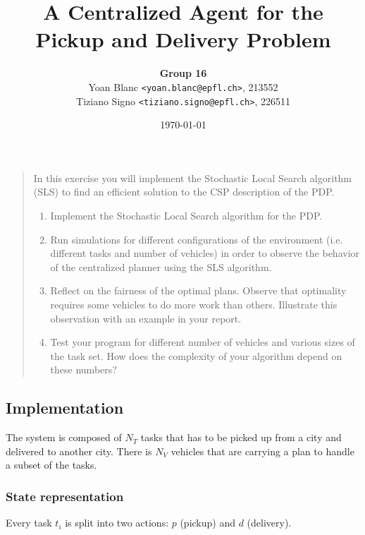 \documentclass[11pt,a4paper]{article}
\title{\phantomsection%
    A Centralized Agent for the Pickup and Delivery Problem
}
\author{
    \textbf{Group 16}\\
    Yoan Blanc \texttt{<yoan.blanc@epfl.ch>}, 213552\\
    Tiziano Signo \texttt{<tiziano.signo@epfl.ch>}, 226511
}
\date{\today}
\begin{document}
\maketitle

\noindent
\begin{quote}{\it

    In this exercise you will implement the Stochastic Local Search algorithm
    (SLS) to find an efficient solution to the CSP description of the PDP.

    \begin{enumerate}
        \item Implement the Stochastic Local Search algorithm for the PDP.

        \item Run simulations for different configurations of the environment
        (i.e. different tasks and number of vehicles) in order to observe the
        behavior of the centralized planner using the SLS algorithm.

        \item Reflect on the fairness of the optimal plans. Observe that
        optimality requires some vehicles to do more work than others.
        Illustrate this observation with an example in your report.

        \item Test your program for different number of vehicles and various
        sizes of the task set. How does the complexity of your algorithm depend
        on these numbers?

    \end{enumerate}

}\end{quote}

\newpage
\subsection*{Implementation}

The system is composed of $N_T$ tasks that has to be picked up from a city
and delivered to another city. There is $N_V$ vehicles that are carrying a
plan to handle a subset of the tasks.

\subsubsection*{State representation}

Every task $t_i$ is split into two actions: $p$ (pickup) and $d$ (delivery).
\end{document}
